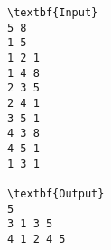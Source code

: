 \begin{verbatim}
\textbf{Input}
5 8
1 5
1 2 1
1 4 8
2 3 5
2 4 1
3 5 1
4 3 8
4 5 1
1 3 1

\textbf{Output}
5
3 1 3 5 
4 1 2 4 5
\end{verbatim}